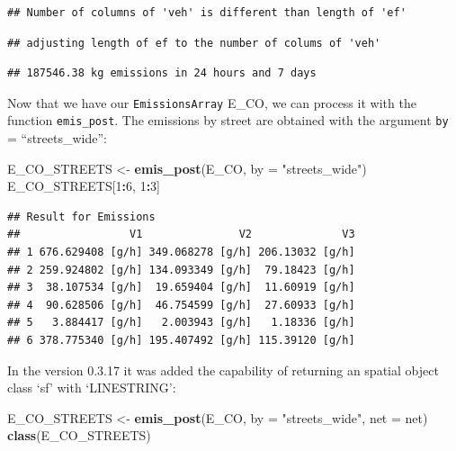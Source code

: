 \documentclass[12pt,graybox,envcountchap,sectrefs]{krantz}
\makeatletter
\newenvironment{Shaded}{\begin{snugshade}}{\end{snugshade}}
\newcommand{\KeywordTok}[1]{\textcolor[rgb]{0.13,0.29,0.53}{\textbf{#1}}}
\newcommand{\DataTypeTok}[1]{\textcolor[rgb]{0.13,0.29,0.53}{#1}}
\newcommand{\DecValTok}[1]{\textcolor[rgb]{0.00,0.00,0.81}{#1}}
\newcommand{\StringTok}[1]{\textcolor[rgb]{0.31,0.60,0.02}{#1}}
\newcommand{\OperatorTok}[1]{\textcolor[rgb]{0.81,0.36,0.00}{\textbf{#1}}}
\newcommand{\NormalTok}[1]{#1}
\newenvironment{kframe}{%
\medskip{}
\setlength{\fboxsep}{.8em}
 \def\at@end@of@kframe{}%
 \ifinner\ifhmode%
  \def\at@end@of@kframe{\end{minipage}}%
  \begin{minipage}{\columnwidth}%
 \fi\fi%
 \def\FrameCommand##1{\hskip\@totalleftmargin \hskip-\fboxsep
 \colorbox{shadecolor}{##1}\hskip-\fboxsep
     \hskip-\linewidth \hskip-\@totalleftmargin \hskip\columnwidth}%
 \MakeFramed {\advance\hsize-\width
   \@totalleftmargin\z@ \linewidth\hsize
   \@setminipage}}%
 {\par\unskip\endMakeFramed%
 \at@end@of@kframe}
\renewenvironment{Shaded}{\begin{kframe}}{\end{kframe}}
\theoremstyle{definition}
\theoremstyle{definition}
\theoremstyle{definition}
\theoremstyle{remark}
\makeatother
\begin{document}
\begin{verbatim}
## Number of columns of 'veh' is different than length of 'ef'
\end{verbatim}

\begin{verbatim}
## adjusting length of ef to the number of colums of 'veh'
\end{verbatim}

\begin{verbatim}
## 187546.38 kg emissions in 24 hours and 7 days
\end{verbatim}

Now that we have our \texttt{EmissionsArray} E\_CO, we can process it
with the function \texttt{emis\_post}. The emissions by street are
obtained with the argument \texttt{by} = ``streets\_wide'':

\begin{Shaded}
\begin{Highlighting}[]
\NormalTok{E_CO_STREETS <-}\StringTok{ }\KeywordTok{emis_post}\NormalTok{(E_CO, }\DataTypeTok{by =} \StringTok{"streets_wide"}\NormalTok{)}
\NormalTok{E_CO_STREETS[}\DecValTok{1}\OperatorTok{:}\DecValTok{6}\NormalTok{, }\DecValTok{1}\OperatorTok{:}\DecValTok{3}\NormalTok{]}
\end{Highlighting}
\end{Shaded}

\begin{verbatim}
## Result for Emissions 
##                 V1               V2              V3
## 1 676.629408 [g/h] 349.068278 [g/h] 206.13032 [g/h]
## 2 259.924802 [g/h] 134.093349 [g/h]  79.18423 [g/h]
## 3  38.107534 [g/h]  19.659404 [g/h]  11.60919 [g/h]
## 4  90.628506 [g/h]  46.754599 [g/h]  27.60933 [g/h]
## 5   3.884417 [g/h]   2.003943 [g/h]   1.18336 [g/h]
## 6 378.775340 [g/h] 195.407492 [g/h] 115.39120 [g/h]
\end{verbatim}

In the version 0.3.17 it was added the capability of returning an
spatial object class `sf' with `LINESTRING':

\begin{Shaded}
\begin{Highlighting}[]
\NormalTok{E_CO_STREETS <-}\StringTok{ }\KeywordTok{emis_post}\NormalTok{(E_CO, }\DataTypeTok{by =} \StringTok{"streets_wide"}\NormalTok{, }\DataTypeTok{net =}\NormalTok{ net)}
\KeywordTok{class}\NormalTok{(E_CO_STREETS)}
\end{Highlighting}
\end{Shaded}
\end{document}
